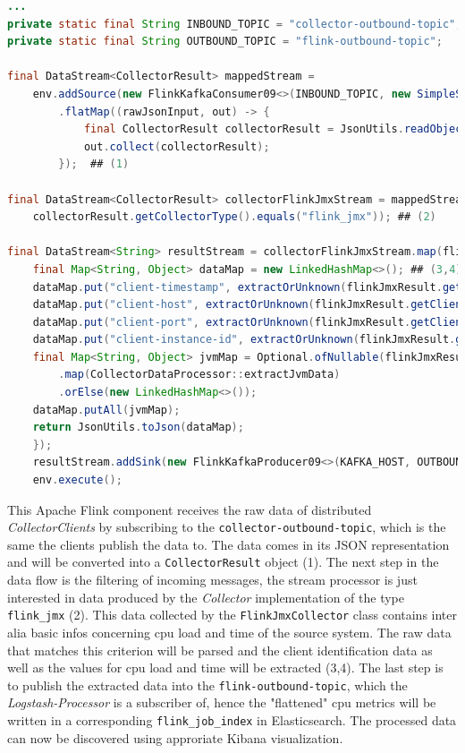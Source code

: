 \begin{lstlisting}[caption={Apache Flink raw data stream processor}, captionpos=b, label={lst:flink-processor},language=Java]
...
private static final String INBOUND_TOPIC = "collector-outbound-topic";
private static final String OUTBOUND_TOPIC = "flink-outbound-topic";

final DataStream<CollectorResult> mappedStream =
    env.addSource(new FlinkKafkaConsumer09<>(INBOUND_TOPIC, new SimpleStringSchema(), properties))
        .flatMap((rawJsonInput, out) -> {
            final CollectorResult collectorResult = JsonUtils.readObject(CollectorResult.class, rawJsonInput);
            out.collect(collectorResult);
        });  ## (1)

final DataStream<CollectorResult> collectorFlinkJmxStream = mappedStream.filter(collectorResult ->
    collectorResult.getCollectorType().equals("flink_jmx")); ## (2)

final DataStream<String> resultStream = collectorFlinkJmxStream.map(flinkJmxResult -> {
    final Map<String, Object> dataMap = new LinkedHashMap<>(); ## (3,4)
    dataMap.put("client-timestamp", extractOrUnknown(flinkJmxResult.getClientTimestamp()));
    dataMap.put("client-host", extractOrUnknown(flinkJmxResult.getClientHost()));
    dataMap.put("client-port", extractOrUnknown(flinkJmxResult.getClientPort()));
    dataMap.put("client-instance-id", extractOrUnknown(flinkJmxResult.getInstanceId()));
    final Map<String, Object> jvmMap = Optional.ofNullable(flinkJmxResult.getData())
        .map(CollectorDataProcessor::extractJvmData)
        .orElse(new LinkedHashMap<>());
    dataMap.putAll(jvmMap);
    return JsonUtils.toJson(dataMap);
    });
    resultStream.addSink(new FlinkKafkaProducer09<>(KAFKA_HOST, OUTBOUND_TOPIC, new SimpleStringSchema())); ## (5)
    env.execute();
\end{lstlisting}

This Apache Flink component receives the raw data of distributed \textit{CollectorClients} by subscribing to the \verb|collector-outbound-topic|,
which is the same the clients publish the data to. The data comes in its JSON representation and will be converted into a \verb|CollectorResult|
object (1). The next step in the data flow is the filtering of incoming messages, the stream processor is just interested in data
produced by the \textit{Collector} implementation of the type \verb|flink_jmx| (2). This data collected by the  \verb|FlinkJmxCollector| class contains
inter alia basic infos concerning cpu load and time of the source system. The raw data that matches this criterion will be parsed and
the client identification data as well as the values for cpu load and time will be extracted (3,4). The last step is to publish the
extracted data into the \verb|flink-outbound-topic|, which the \textit{Logstash-Processor} is a subscriber of, hence the "flattened"
cpu metrics will be written in a corresponding \verb|flink_job_index| in Elasticsearch. The processed data can now be discovered using approriate Kibana visualization.

